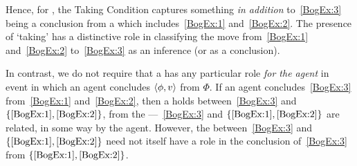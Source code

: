 \begin{note}
  Hence, for \citeauthor{Boghossian:2014aa}, the Taking Condition captures something \emph{in addition} to~\ref{BogEx:3} being a conclusion from a \poP{} which includes~\ref{BogEx:1} and~\ref{BogEx:2}.
  The presence of `taking' has a distinctive role in classifying the move from~\ref{BogEx:1} and~\ref{BogEx:2} to~\ref{BogEx:3} as an inference (or as a conclusion).

  In contrast, we do not require that a \ros{} has any particular role \emph{for the agent} in event in which an agent concludes \(\langle \phi, v \rangle\) from \(\Phi\).
  If an agent concludes~\ref{BogEx:3} from~\ref{BogEx:1} and~\ref{BogEx:2}, then a \ros{} holds between~\ref{BogEx:3} and \(\{\ref{BogEx:1}, \ref{BogEx:2}\}\), from the \agpe{} ---~\ref{BogEx:3} and \(\{\ref{BogEx:1}, \ref{BogEx:2}\}\) are related, in some way by the agent.
  However, the \ros{} between~\ref{BogEx:3} and \(\{\ref{BogEx:1}, \ref{BogEx:2}\}\) need not itself have a role in the \agents{} conclusion of~\ref{BogEx:3} from \(\{\ref{BogEx:1}, \ref{BogEx:2}\}\).
\end{note}

